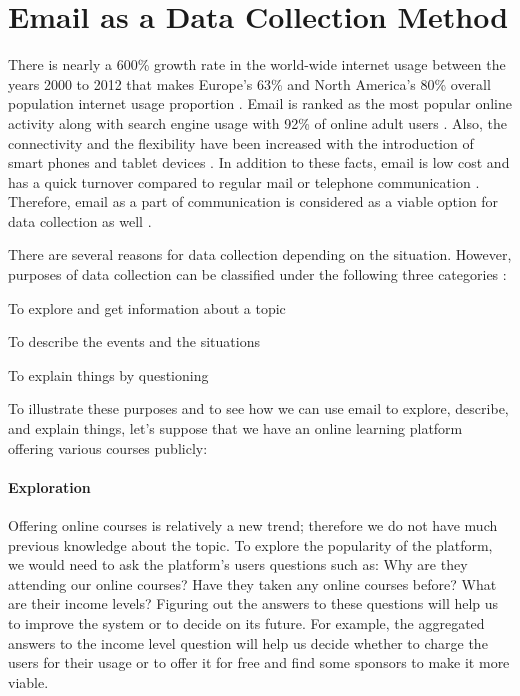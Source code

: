 \section{Email as a Data Collection Method}
\label{sec:1:EmailDataCol}

There is nearly a 600\% growth rate in the world-wide internet usage between the years 2000 to 2012 that makes Europe's 63\% and North America's 80\% overall population internet usage proportion \citep{InternetWorldStats2012}. Email is ranked as the most popular online activity along with search engine usage with 92\% of online adult users \citep{Purcell2011}. Also, the connectivity and the flexibility have been increased with the introduction of smart phones and tablet devices \citep{Madden2008}. In addition to these facts, email is low cost and has a quick turnover compared to regular mail or telephone communication \citep{Zikmund2007}. Therefore, email as a part of communication is considered as a viable option for data collection as well \citep{Zikmund2007}.
\vspace{1cm}

There are several reasons for data collection depending on the situation. However, purposes of data collection can be classified under the following three categories \citep{Sue2011} \citep[pages 92--94]{Babbie2010}:

\begin{compactenum}
	\item To explore and get information about a topic
	\item To describe the events and the situations
	\item To explain things by questioning
\end{compactenum}

To illustrate these purposes and to see how we can use email to explore, describe, and explain things, let's suppose that we have an online learning platform offering various courses publicly:

\paragraph{Exploration}
Offering online courses is relatively a new trend; therefore we do not have much previous knowledge about the topic. To explore the popularity of the platform, we would need to ask the platform's users questions such as: Why are they attending our online courses? Have they taken any online courses before? What are their income levels? Figuring out the answers to these questions will help us to improve the system or to decide on its future. For example, the aggregated answers to the income level question will help us decide whether to charge the users for their usage or to offer it for free and find some sponsors to make it more viable.

